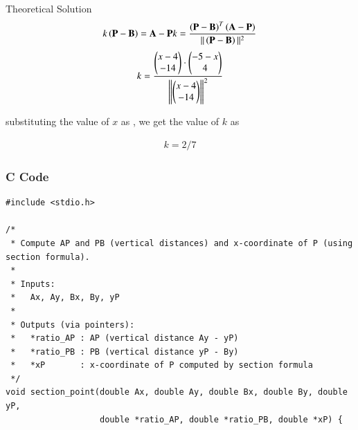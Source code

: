 \documentclass{beamer}
\begin{document}
\begin{frame}{Theoretical Solution}
\begin{align}
    k\left(\mathbf{P}- \mathbf{B}\right) = \mathbf{A}-\mathbf{P}
k=\frac{\left(\mathbf{P}-\mathbf{B}\right)^T\left(\mathbf{A}-\mathbf{P}\right)}{||\left(\mathbf{P}-\mathbf{B}\right)||^2}    
\end{align}
\begin{align}
    k=\frac{\begin{pmatrix}x-4 \\ -14\end{pmatrix} \cdot \begin{pmatrix}-5-x\\4\end{pmatrix}}{{\left\lVert\begin{pmatrix}x-4 \\ -14\end{pmatrix}\right\rVert}^2}
\end{align}

substituting the value of $x$ as , we get the value of $k$ as

\begin{align}
    k=2/7
\end{align}
\end{frame}

\begin{frame}[fragile]
\frametitle{C Code }
\begin{lstlisting}
#include <stdio.h>

/*
 * Compute AP and PB (vertical distances) and x-coordinate of P (using section formula).
 *
 * Inputs:
 *   Ax, Ay, Bx, By, yP
 *
 * Outputs (via pointers):
 *   *ratio_AP : AP (vertical distance Ay - yP)
 *   *ratio_PB : PB (vertical distance yP - By)
 *   *xP       : x-coordinate of P computed by section formula
 */
void section_point(double Ax, double Ay, double Bx, double By, double yP,
                   double *ratio_AP, double *ratio_PB, double *xP) {
\end{lstlisting}
\end{frame}
\end{document}
